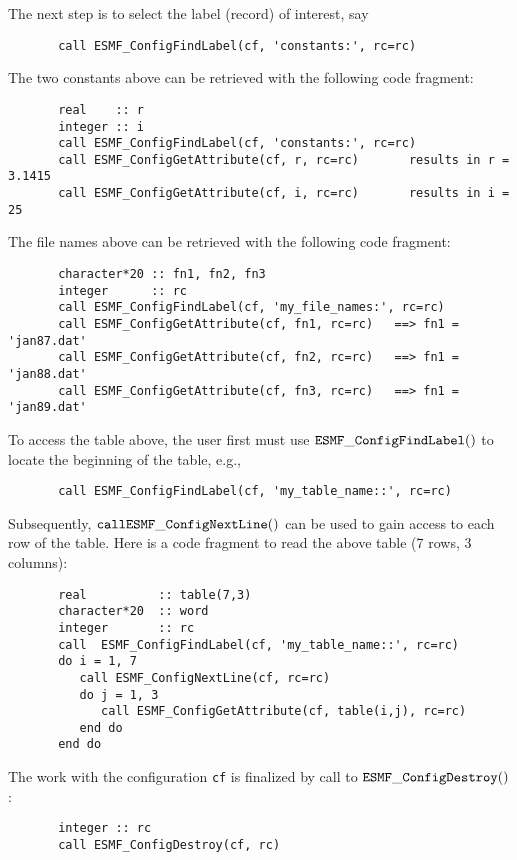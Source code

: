     The next step is to select the label (record) of interest, say

 \begin{verbatim}
       call ESMF_ConfigFindLabel(cf, 'constants:', rc=rc)
 \end{verbatim}

  The two constants above can be retrieved with the following code
  fragment:
 \begin{verbatim}
       real    :: r
       integer :: i
       call ESMF_ConfigFindLabel(cf, 'constants:', rc=rc)
       call ESMF_ConfigGetAttribute(cf, r, rc=rc)       results in r = 3.1415
       call ESMF_ConfigGetAttribute(cf, i, rc=rc)       results in i = 25
 \end{verbatim}

  The file names above can be retrieved with the following
  code fragment:
 \begin{verbatim}
       character*20 :: fn1, fn2, fn3
       integer      :: rc
       call ESMF_ConfigFindLabel(cf, 'my_file_names:', rc=rc)
       call ESMF_ConfigGetAttribute(cf, fn1, rc=rc)   ==> fn1 = 'jan87.dat'
       call ESMF_ConfigGetAttribute(cf, fn2, rc=rc)   ==> fn1 = 'jan88.dat'
       call ESMF_ConfigGetAttribute(cf, fn3, rc=rc)   ==> fn1 = 'jan89.dat'
 \end{verbatim}

 To access the table above, the user first must use 
 ${\tt ESMF\_ConfigFindLabel()}$ to locate the beginning of the table, e.g.,

 \begin{verbatim}
       call ESMF_ConfigFindLabel(cf, 'my_table_name::', rc=rc)
 \end{verbatim}

 Subsequently, ${\tt call ESMF\_ConfigNextLine()}$ can be used to gain 
 access to each row of the table. Here is a code fragment to read the above
 table (7 rows, 3 columns):

 \begin{verbatim}
       real          :: table(7,3)
       character*20  :: word
       integer       :: rc
       call  ESMF_ConfigFindLabel(cf, 'my_table_name::', rc=rc)
       do i = 1, 7
          call ESMF_ConfigNextLine(cf, rc=rc)
          do j = 1, 3
             call ESMF_ConfigGetAttribute(cf, table(i,j), rc=rc)
          end do                   
       end do
 \end{verbatim}

 The work with the configuration {\tt cf} is finalized by call to
 ${\tt ESMF\_ConfigDestroy()}$:
 \begin{verbatim}
       integer :: rc
       call ESMF_ConfigDestroy(cf, rc)
 \end{verbatim}

